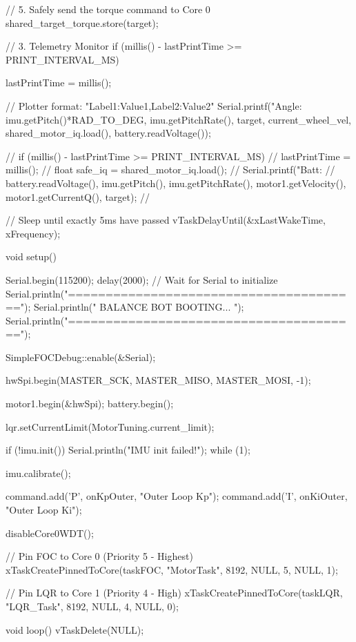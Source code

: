 {{        // 5. Safely send the torque command to Core 0
        shared_target_torque.store(target);

        // 3. Telemetry Monitor
        if (millis() - lastPrintTime >= PRINT_INTERVAL_MS) {
            lastPrintTime = millis();
            
            // Plotter format: "Label1:Value1,Label2:Value2"
            Serial.printf("Angle:%
                          imu.getPitch()*RAD_TO_DEG, 
                          imu.getPitchRate(), target, current_wheel_vel, shared_motor_iq.load(), battery.readVoltage());
        }
        // if (millis() - lastPrintTime >= PRINT_INTERVAL_MS) {
        //     lastPrintTime = millis();
        //     float safe_iq = shared_motor_iq.load();
        //     Serial.printf("Batt: %
        //                   battery.readVoltage(), imu.getPitch(), imu.getPitchRate(), motor1.getVelocity(), motor1.getCurrentQ(), target);
        // }
        
        // Sleep until exactly 5ms have passed
        vTaskDelayUntil(&xLastWakeTime, xFrequency);
    }
}

void setup() {
    Serial.begin(115200);
    delay(2000); // Wait for Serial to initialize
    Serial.println("\n\n=======================================");
    Serial.println("       BALANCE BOT BOOTING...          ");  
    Serial.println("=======================================\n");

    SimpleFOCDebug::enable(&Serial);

    hwSpi.begin(MASTER_SCK, MASTER_MISO, MASTER_MOSI, -1);
    
    motor1.begin(&hwSpi);
    battery.begin();

    lqr.setCurrentLimit(MotorTuning.current_limit);
    
    if (!imu.init()) {
        Serial.println("IMU init failed!");
        while (1);
    }
    
    imu.calibrate();

    command.add('P', onKpOuter, "Outer Loop Kp");
    command.add('I', onKiOuter, "Outer Loop Ki");

    disableCore0WDT();

    // Pin FOC to Core 0 (Priority 5 - Highest)
    xTaskCreatePinnedToCore(taskFOC, "MotorTask", 8192, NULL, 5, NULL, 1);
    
    // Pin LQR to Core 1 (Priority 4 - High)
    xTaskCreatePinnedToCore(taskLQR, "LQR_Task", 8192, NULL, 4, NULL, 0);
}

void loop() {
    vTaskDelete(NULL); 
}